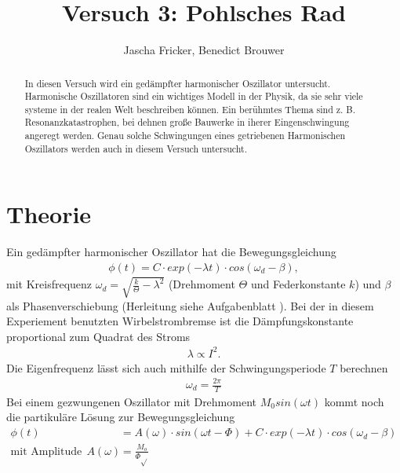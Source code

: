 \documentclass[11pt, a4paper]{article}
\title{Versuch 3: Pohlsches Rad}
\author{Jascha Fricker, Benedict Brouwer}
\begin{document}
    \maketitle

    

    \begin{abstract}
        In diesen Versuch wird ein gedämpfter harmonischer Oszillator untersucht. Harmonische Oszillatoren
        sind ein wichtiges Modell in der Physik, da sie sehr viele systeme in der realen Welt beschreiben können.
        Ein berühmtes Thema sind z. B. Resonanzkatastrophen, bei dehnen große Bauwerke in iherer Eingenschwingung
        angeregt werden. Genau solche Schwingungen eines getriebenen Harmonischen Oszillators werden auch in diesem
        Versuch untersucht.
    \end{abstract}

    \tableofcontents

    \newpage

    \section{Theorie}

    Ein gedämpfter harmonischer Oszillator hat die Bewegungsgleichung
    \begin{align}
        \phi(t) = C \cdot exp(-\lambda t) \cdot cos(\omega_d - \beta),
    \end{align}
    mit Kreisfrequenz $\omega_d = \sqrt{\frac{k}{\Theta} - \lambda^2}$ (Drehmoment $\Theta$ und Federkonstante $k$)
    und $\beta$ als Phasenverschiebung (Herleitung siehe Aufgabenblatt \cite{POR}). Bei der in diesem Experiement benutzten Wirbelstrombremse ist die
    Dämpfungskonstante proportional zum Quadrat des Stroms 
    \begin{align}
        \lambda \propto I^2.
    \end{align}
    Die Eigenfrequenz lässt sich auch mithilfe der Schwingungsperiode $T$ berechnen
    \begin{align}
        \omega_d = \frac{2\pi}{T}
    \end{align}
    Bei einem gezwungenen Oszillator mit Drehmoment $M_0 sin(\omega t)$ kommt noch die partikuläre Lösung zur Bewegungsgleichung
    \begin{align}
        \phi(t) &= A(\omega) \cdot sin(\omega t - \Phi) + C \cdot exp(-\lambda t) \cdot cos(\omega_d - \beta) \\
        \text{mit Amplitude}  \ \ A(\omega) &= \frac{M_o}{\Phi \sqrt{}}
    \end{align}


    
    
\end{document}
